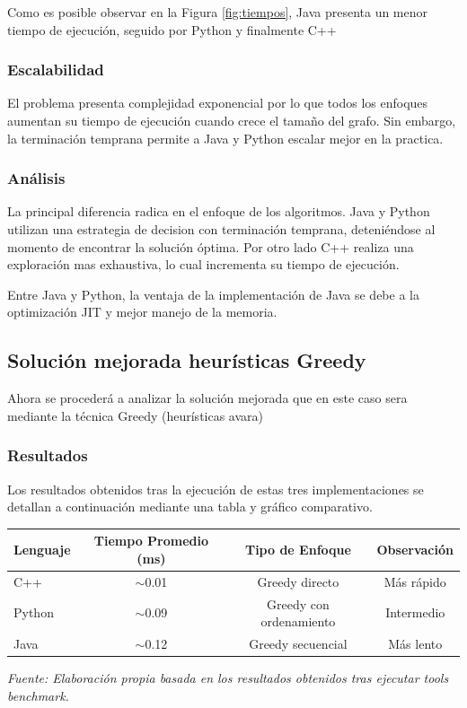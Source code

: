 Como es posible observar en la Figura \ref{fig:tiempos}, Java presenta un menor tiempo de ejecución, seguido por Python y finalmente C++

\subsubsection{Escalabilidad}

El problema presenta complejidad exponencial por lo que todos los enfoques aumentan su tiempo de ejecución cuando crece el tamaño del grafo. Sin embargo, la terminación temprana permite a Java y Python escalar mejor en la practica.

\subsubsection{Análisis}

La principal diferencia radica en el enfoque de los algoritmos. Java y Python utilizan una estrategia de decision con terminación temprana, deteniéndose al momento de encontrar la solución óptima. Por otro lado C++ realiza una exploración mas exhaustiva, lo cual incrementa su tiempo de ejecución.

Entre Java y Python, la ventaja de la implementación de Java se debe a la optimización JIT y mejor manejo de la memoria.



\subsection{Solución mejorada heurísticas Greedy}

Ahora se procederá a analizar la solución mejorada que en este caso sera mediante la técnica Greedy (heurísticas avara)

\subsubsection{Resultados}

Los resultados obtenidos tras la ejecución de estas tres implementaciones se detallan a
continuación mediante una tabla y gráfico comparativo.

\begin{center}
\begin{tabular}{lccc}
\toprule
Lenguaje & Tiempo Promedio (ms) & Tipo de Enfoque & Observación \\
\midrule
C++    & $\sim$0.01  & Greedy directo        & Más rápido \\
Python & $\sim$0.09  & Greedy con ordenamiento & Intermedio \\
Java   & $\sim$0.12  & Greedy secuencial     & Más lento \\
\bottomrule
\end{tabular}
\end{center}
\small \textit{Fuente: Elaboración propia basada en los resultados obtenidos tras ejecutar tools benchmark.}


